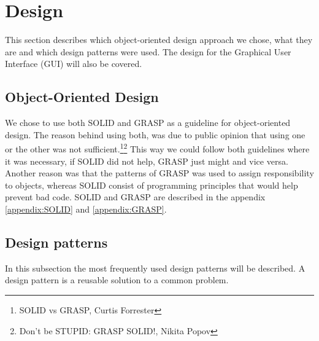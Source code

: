 
\section{Design}
This section describes which object-oriented design approach we chose,
 what they are and which design patterns were used. The design for the
 Graphical User Interface (GUI) will also be covered.

		\subsection{Object-Oriented Design}
We chose to use both SOLID and GRASP as a guideline for object-oriented
 design. The reason behind using both, was due to public opinion that using
  one or the other was not
	sufficient.\footnote{SOLID vs GRASP, Curtis Forrester}\footnote{ Don't be STUPID: GRASP SOLID!, Nikita Popov}
  This way we could follow both guidelines where it was necessary, if
  SOLID did not help, GRASP just might and vice versa. Another reason
   was that the patterns of GRASP was used to assign responsibility to
    objects, whereas SOLID consist of programming principles that would
    help prevent bad code. SOLID and GRASP are described in the appendix \ref{appendix:SOLID} and \ref{appendix:GRASP}.
		\subsection{Design patterns}
In this subsection the most frequently used design patterns will be described.
 A design pattern is a reusable solution to a common problem.
